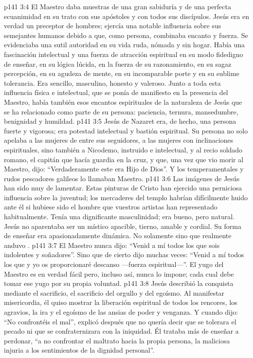 \vs p141 3:4 \pc El Maestro daba muestras de una gran sabiduría y de una perfecta ecuanimidad en su trato con sus apóstoles y con todos sus discípulos. Jesús era en verdad un preceptor de hombres; ejercía una notable influencia sobre sus semejantes humanos debido a que, como persona, combinaba encanto y fuerza. Se evidenciaba una sutil autoridad en su vida ruda, nómada y sin hogar. Había una fascinación intelectual y una fuerza de atracción espiritual en su modo fidedigno de enseñar, en su lógica lúcida, en la fuerza de su razonamiento, en su sagaz percepción, en su agudeza de mente, en su incomparable porte y en su sublime tolerancia. Era sencillo, masculino, honesto y valeroso. Junto a toda esta influencia física e intelectual, que se ponía de manifiesto en la presencia del Maestro, había también esos encantos espirituales de la naturaleza de Jesús que se ha relacionado como parte de su persona: paciencia, ternura, mansedumbre, benignidad y humildad.
\vs p141 3:5 Jesús de Nazaret era, de hecho, una persona fuerte y vigorosa; era potestad intelectual y bastión espiritual. Su persona no solo apelaba a las mujeres de entre sus seguidores, a las mujeres con inclinaciones espirituales, sino también a Nicodemo, instruido e intelectual, y al recio soldado romano, el capitán que hacía guardia en la cruz, y que, una vez que vio morir al Maestro, dijo: “Verdaderamente este era Hijo de Dios”. Y los temperamentales y rudos pescadores galileos lo llamaban Maestro.
\vs p141 3:6 Las imágenes de Jesús han sido muy de lamentar. Estas pinturas de Cristo han ejercido una perniciosa influencia sobre la juventud; los mercaderes del templo habrían difícilmente huido ante él si hubiese sido el hombre que vuestros artistas han representado habitualmente. Tenía una dignificante masculinidad; era bueno, pero natural. Jesús no aparentaba ser un místico apacible, tierno, amable y cordial. Su forma de enseñar era apasionadamente dinámica. No solamente  sino que realmente anduvo .
\vs p141 3:7 El Maestro nunca dijo: “Venid a mí todos los que sois indolentes y soñadores”. Sino que de cierto dijo muchas veces: “Venid a mí todos los que  y yo os proporcionaré descanso ---fuerza espiritual---”. El yugo del Maestro es en verdad fácil pero, incluso así, nunca lo impone; cada cual debe tomar ese yugo por su propia voluntad.
\vs p141 3:8 Jesús describió la conquista mediante el sacrificio, el sacrificio del orgullo y del egoísmo. Al manifestar misericordia, él quiso mostrar la liberación espiritual de todos los rencores, los agravios, la ira y el egoísmo de las ansias de poder y venganza. Y cuando dijo: “No confrontéis el mal”, explicó después que no quería decir que se tolerara el pecado ni que se confraternizara con la iniquidad. Él trataba más de enseñar a perdonar, “a no confrontar el maltrato hacia la propia persona, la maliciosa injuria a los sentimientos de la dignidad personal”.
